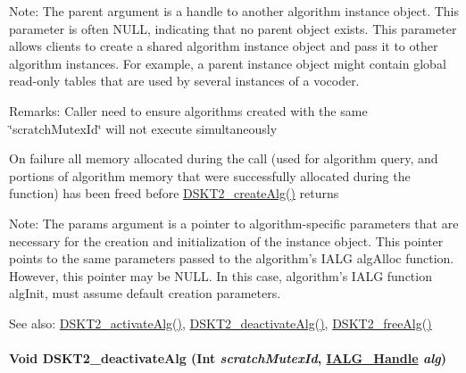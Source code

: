 \begin{Desc}
\item[Note:]The parent argument is a handle to another algorithm instance object. This parameter is often NULL, indicating that no parent object exists. This parameter allows clients to create a shared algorithm instance object and pass it to other algorithm instances. For example, a parent instance object might contain global read-only tables that are used by several instances of a vocoder.\end{Desc}
\begin{Desc}
\item[Remarks:]Caller need to ensure algorithms created with the same \char`\"{}scratch\-Mutex\-Id\char`\"{} will not execute simultaneously

On failure all memory allocated during the call (used for algorithm query, and portions of algorithm memory that were successfully allocated during the function) has been freed before \hyperlink{group___d_s_p_d_s_k_t2_g5528d73c34724bc310404da0dc2fbd69}{DSKT2\_\-create\-Alg()} returns\end{Desc}
\begin{Desc}
\item[Note:]The params argument is a pointer to algorithm-specific parameters that are necessary for the creation and initialization of the instance object. This pointer points to the same parameters passed to the algorithm's IALG alg\-Alloc function. However, this pointer may be NULL. In this case, algorithm's IALG function alg\-Init, must assume default creation parameters.\end{Desc}
\begin{Desc}
\item[See also:]\hyperlink{group___d_s_p_d_s_k_t2_gf946d426d6d9a95040d3967fa746cd7a}{DSKT2\_\-activate\-Alg()}, \hyperlink{group___d_s_p_d_s_k_t2_g74b6b6feca63328906acade37d23b597}{DSKT2\_\-deactivate\-Alg()}, \hyperlink{group___d_s_p_d_s_k_t2_g8dffa02b3ca1ff6856ce3cf610be7435}{DSKT2\_\-free\-Alg()} \end{Desc}
\hypertarget{group___d_s_p_d_s_k_t2_g74b6b6feca63328906acade37d23b597}{
\paragraph[DSKT2\_\-deactivateAlg]{\setlength{\rightskip}{0pt plus 5cm}Void DSKT2\_\-deactivate\-Alg (Int {\em scratch\-Mutex\-Id}, \hyperlink{struct_i_a_l_g___obj}{IALG\_\-Handle} {\em alg})}\hfill}
\label{group___d_s_p_d_s_k_t2_g74b6b6feca63328906acade37d23b597}


